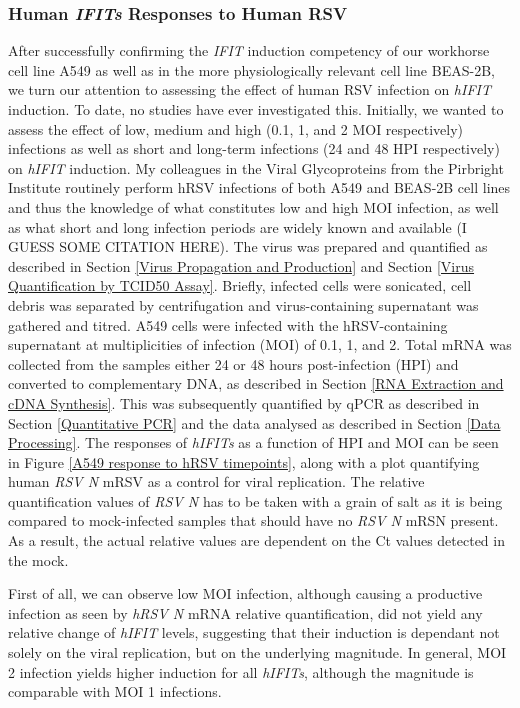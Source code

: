 \subsubsection{Human \textit{IFITs} Responses to Human RSV} \label{Human \textit{IFITs} Responses to Human RSV}
After successfully confirming the \textit{IFIT} induction competency of  our workhorse cell line A549 as well as in the more physiologically relevant cell line BEAS-2B, we turn our attention to assessing the effect of human RSV infection on \textit{hIFIT} induction. To date, no studies have ever investigated this. Initially, we wanted to assess the effect of low, medium and high (0.1, 1, and 2 MOI respectively) infections as well as short and long-term infections (24 and 48 HPI respectively) on \textit{hIFIT} induction. My colleagues in the Viral Glycoproteins from the Pirbright Institute routinely perform hRSV infections of both A549 and BEAS-2B cell lines and thus the knowledge of what constitutes low and high MOI infection, as well as what short and long infection periods are widely known and available (I GUESS SOME CITATION HERE).  The virus was prepared and quantified as described in Section \ref{Virus Propagation and Production} and Section \ref{Virus Quantification by TCID50 Assay}. Briefly, infected cells were sonicated, cell debris was separated by centrifugation and virus-containing supernatant was gathered and titred. A549 cells were infected with the hRSV-containing supernatant at multiplicities of infection (MOI) of 0.1, 1,  and 2. Total mRNA was collected from the samples either 24 or 48 hours post-infection (HPI) and converted to complementary DNA, as described in Section \ref{RNA Extraction and cDNA Synthesis}. This was subsequently quantified by qPCR as described in Section \ref{Quantitative PCR}
 and the data analysed as described in Section \ref{Data Processing}. The responses of \textit{hIFITs} as a function of HPI and MOI can be seen in Figure \ref{A549 response to hRSV timepoints}, along with a plot quantifying human \textit{RSV N} mRSV as a control for viral replication. The relative quantification values of \textit{RSV N} has to be taken with a grain of salt as it is being compared to mock-infected samples that should have no \textit{RSV N} mRSN present. As a result, the actual relative values are dependent on the Ct values detected in the mock. 
 
 First of all, we can observe low MOI infection, although causing a productive infection as seen by \textit{hRSV N} mRNA relative quantification, did not yield any relative change of \textit{hIFIT} levels, suggesting that their induction is dependant not solely on the viral replication, but on the underlying magnitude. In general, MOI 2 infection yields higher induction for all \textit{hIFITs}, although the magnitude is comparable with MOI 1 infections. 

